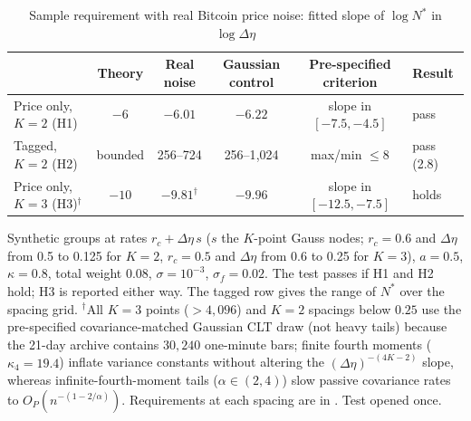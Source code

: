 \documentclass[12pt]{article}
\theoremstyle{definition}
\theoremstyle{remark}
\begin{document}
\begin{table}[t]\centering\small
\begin{threeparttable}
\caption{Sample requirement with real Bitcoin price noise: fitted slope of $\log N^*$ in $\log\Delta\eta$}\label{tab:injection}
\begin{tabular}{lccccl}
\toprule
 & Theory & Real noise & Gaussian control & Pre-specified criterion & Result\\
\midrule
Price only, $K=2$ (H1) & $-6$ & $-6.01$ & $-6.22$ & slope in $[-7.5,-4.5]$ & pass\\
Tagged, $K=2$ (H2) & bounded & 256--724 & 256--1{,}024 & max/min $\le8$ & pass (2.8)\\
Price only, $K=3$ (H3)$^\dagger$ & $-10$ & $-9.81^\dagger$ & $-9.96$ & slope in $[-12.5,-7.5]$ & holds\\
\bottomrule
\end{tabular}
\begin{tablenotes}\footnotesize\item Synthetic groups at rates $r_c+\Delta\eta\,s$ ($s$ the $K$-point Gauss nodes; $r_c=0.6$ and $\Delta\eta$ from 0.5 to 0.125 for $K=2$, $r_c=0.5$ and $\Delta\eta$ from 0.6 to 0.25 for $K=3$), $a=0.5$, $\kappa=0.8$, total weight 0.08, $\sigma=10^{-3}$, $\sigma_f=0.02$. The test passes if H1 and H2 hold; H3 is reported either way. The tagged row gives the range of $N^*$ over the spacing grid. $^\dagger$All $K=3$ points ($>4{,}096$) and $K=2$ spacings below $0.25$ use the pre-specified covariance-matched Gaussian CLT draw (not heavy tails) because the 21-day archive contains $30{,}240$ one-minute bars; finite fourth moments ($\kappa_4 = 19.4$) inflate variance constants without altering the $(\Delta\eta)^{-(4K-2)}$ slope, whereas infinite-fourth-moment tails ($\alpha \in (2,4)$) slow passive covariance rates to $O_P(n^{-(1-2/\alpha)})$. Requirements at each spacing are in \citet{niroula2026a}. Test opened once.\end{tablenotes}
\end{threeparttable}
\end{table}
\end{document}
